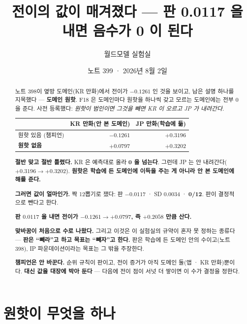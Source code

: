 \documentclass[11pt]{article}
\begin{document}
\title{전이의 값이 매겨졌다 --- 판 0.0117 을 내면 음수가 0 이 된다}
\author{월드모델 실험실}
\date{노트 399 · 2026년 8월 2일}
\maketitle

\begin{abstract}
노트 398이 옆방 도메인(KR 만화)에서 전이가 $-0.1261$ 인 것을 보이고, 남은
설명 하나를 지목했다 --- \textbf{도메인 원핫}. F18 은 도메인마다 원핫을
하나씩 갖고 모르는 도메인에는 전부 0 을 준다. 사전 등록했다: \emph{원핫이
범인이면 그것을 빼면 KR 이 오르고 JP 가 내려간다.}

\begin{center}
\begin{tabular}{lrr}
\hline
 & KR 만화(안 본 도메인) & JP 만화(학습에 듦) \\
\hline
원핫 있음 (챔피언) & $-0.1261$ & $+0.3196$ \\
\textbf{원핫 없음} & $\mathbf{+0.0797}$ & $+0.3202$ \\
\hline
\end{tabular}
\end{center}

\textbf{절반 맞고 절반 틀렸다.} KR 은 예측대로 올라 \textbf{0 을 넘는다}.
그런데 JP 는 안 내려간다($+0.3196 \to +0.3202$). \textbf{원핫은 학습에 든
도메인에 이득을 주는 게 아니라 안 본 도메인에 해를 준다.}

\textbf{그러면 값이 얼마인가.} 짝 12뽑기로 쟀다: 판
$\mathbf{-0.0117}$ · SD 0.0034 · \textbf{0/12}. 판이 결정적으로 뺀다고
한다.

\begin{center}
\textbf{판 $0.0117$ 을 내면 전이가 $-0.1261 \to +0.0797$, 즉
$+0.2058$ 만큼 산다.}
\end{center}

\textbf{맞바꿈이 처음으로 수로 나왔다.} 그리고 이것은 이 실험실의 규약이
혼자 못 정하는 종류다 --- \textbf{판은 ``빼라''고 하고 목표는 ``빼자''고
한다.} 판은 학습에 든 도메인 안의 수이고(노트 398), IP 파운데이션이라는
목표는 그 밖을 주장한다.

\textbf{챔피언은 안 바꾼다.} 순위 규칙이 판이고, 전이 증거가 아직 도메인
둘(앱 · KR 만화)뿐이다. \textbf{대신 값을 대장에 박아 둔다} --- 다음에
전이 점이 서넛 더 쌓이면 이 수가 결정을 정한다.
\end{abstract}

\section{원핫이 무엇을 하나}
\end{document}
